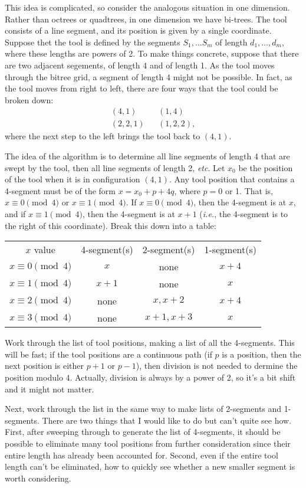 \documentclass[titlepage,oneside,10pt]{article}
\begin{document}
This idea is complicated, so consider the analogous situation in one
dimension. Rather than octrees or quadtrees, in one dimension we have
bi-trees. The tool consists of a line segment, and its position is
given by a single coordinate. Suppose thet the tool is defined by the
segments $S_1,\ldots S_m$ of length $d_1,\ldots,d_m$, where these
lengths are powers of 2. To make things concrete, suppose that there
are two adjacent segements, of length 4 and of length 1. As the tool
moves through the bitree grid, a segment of length 4 might not be
possible. In fact, as the tool moves from right to left, there are
four ways that the tool could be broken down:
\begin{eqnarray*}
(4,1) && (1,4) \\
(2,2,1) && (1,2,2),
\end{eqnarray*}
where the next step to the left brings the tool back to $(4,1)$.

The idea of the algorithm is to determine all line segments of length
4 that are swept by the tool, then all line segments of length 2,
\emph{etc}. Let $x_0$ be the position of the tool when it is in
configuration $(4,1)$. Any tool position that contains a 4-segment
must be of the form $x=x_0 + p + 4q$, where $p=0$ or 1. That is,
$x\equiv 0\pmod 4$ or $x\equiv 1\pmod 4$. If $x\equiv 0\pmod 4$, then
the 4-segment is at $x$, and if $x\equiv 1\pmod 4$, then the 4-segment
is at $x+1$ (\emph{i.e.}, the 4-segment is to the right of this
coordinate). Break this down into a table:
\vskip 0.25cm
\begin{tabular}{cccc}
$x$ value&4-segment(s)&2-segment(s)&1-segment(s)\\
$x\equiv 0\pmod 4$ & $x$   & none      & $x+4$ \\
$x\equiv 1\pmod 4$ & $x+1$ & none      & $x$   \\
$x\equiv 2\pmod 4$ & none  & $x, x+2$  & $x+4$ \\
$x\equiv 3\pmod 4$ & none  & $x+1,x+3$ & $x$\\
\end{tabular}
\vskip 0.25cm
Work through the list of tool positions, making a list of all the
4-segments. This will be fast; if the tool positions are a continuous
path (if $p$ is a position, then the next position is either $p+1$ or
$p-1$), then division is not needed to dermine the position modulo
4. Actually, division is always by a power of 2, so it's a bit shift
and it might not matter.

Next, work through the list in the same way to make lists of
2-segments and 1-segments. There are two things that I would like to
do but can't quite see how. First, after sweeping through to generate
the list of 4-segments, it should be possible to eliminate many tool
positions from further consideration since their entire length has
already been accounted for. Second, even if the entire tool length
can't be eliminated, how to quickly see whether a new smaller segment
is worth considering.
\end{document}
